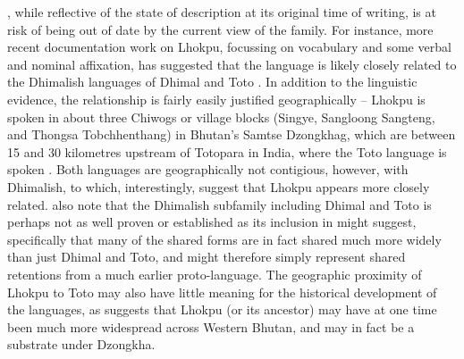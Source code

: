 , while reflective of the state of description at its original time of writing, is at risk of being out of date by the current view of the family. For instance, more recent documentation work on Lhokpu, focussing on vocabulary and some verbal and nominal affixation, has suggested that the language is likely closely related to the Dhimalish languages of Dhimal and Toto \cite{Grollmann2018}. In addition to the linguistic evidence, the relationship is fairly easily justified geographically -- Lhokpu is spoken in about three Chiwogs or village blocks (Singye, Sangloong Sangteng, and Thongsa Tobchhenthang) in Bhutan's Samtse Dzongkhag, which are between 15 and 30 kilometres upstream of Totopara in India, where the Toto language is spoken \cite{Basumatary2016}. Both languages are geographically not contigious, however, with Dhimalish, to which, interestingly,  suggest that Lhokpu appears more closely related.  also note that the Dhimalish subfamily including Dhimal and Toto is perhaps not as well proven or established as its inclusion in  might suggest, specifically that many of the shared forms are in fact shared much more widely than just Dhimal and Toto, and might therefore simply represent shared retentions from a much earlier proto-language. The geographic proximity of Lhokpu to Toto may also have little meaning for the historical development of the languages, as  suggests that Lhokpu (or its ancestor) may have at one time been much more widespread across Western Bhutan, and may in fact be a substrate under Dzongkha.

